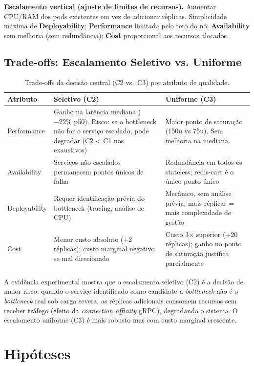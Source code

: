 \documentclass[acmsmall,screen=true,nonacm]{acmart}
\begin{document}
\textbf{Escalamento vertical (ajuste de limites de recursos).} Aumentar CPU/RAM dos pods existentes em vez de adicionar réplicas. Simplicidade máxima de \textbf{Deployability}; \textbf{Performance} limitada pelo teto do nó; \textbf{Availability} sem melhoria (sem redundância); \textbf{Cost} proporcional aos recursos alocados.

\subsection{Trade-offs: Escalamento Seletivo vs. Uniforme}

\begin{table}[h]
\caption{Trade-offs da decisão central (C2 vs.\ C3) por atributo de qualidade.}
\label{tab:tradeoffs}
\begin{tabular}{p{1.8cm}p{2.8cm}p{2.8cm}}
\toprule
\textbf{Atributo} & \textbf{Seletivo (C2)} & \textbf{Uniforme (C3)} \\
\midrule
Performance & Ganho na latência mediana ($-22\%$ p50). Risco: se o bottleneck não for o serviço escalado, pode degradar (C2 < C1 nos exaustivos) & Maior ponto de saturação (150u vs 75u). Sem melhoria na mediana. \\
\addlinespace
Availability & Serviços não escalados permanecem pontos únicos de falha & Redundância em todos os stateless; redis-cart é o único ponto único \\
\addlinespace
Deployability & Requer identificação prévia do bottleneck (tracing, análise de CPU) & Mecânico, sem análise prévia; mais réplicas = mais complexidade de gestão \\
\addlinespace
Cost & Menor custo absoluto (+2 réplicas); custo marginal negativo se mal direcionado & Custo 3× superior (+20 réplicas); ganho no ponto de saturação justifica parcialmente \\
\bottomrule
\end{tabular}
\end{table}

A evidência experimental mostra que o escalamento seletivo (C2) é a decisão de maior risco: quando o serviço identificado como candidato a \textit{bottleneck} não é o \textit{bottleneck} real sob carga severa, as réplicas adicionais consomem recursos sem receber tráfego (efeito da \textit{connection affinity} gRPC), degradando o sistema. O escalamento uniforme (C3) é mais robusto mas com custo marginal crescente.

\section{Hipóteses}
\end{document}
